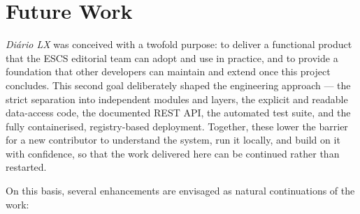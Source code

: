 \section{Future Work} \label{sec:conc_future}

\textit{Diário LX} was conceived with a twofold purpose: to deliver a functional product
that the ESCS editorial team can adopt and use in practice, and to provide a foundation
that other developers can maintain and extend once this project concludes. This second
goal deliberately shaped the engineering approach --- the strict separation into
independent modules and layers, the explicit and readable data-access code, the
documented REST API, the automated test suite, and the fully containerised,
registry-based deployment. Together, these lower the barrier for a new contributor to
understand the system, run it locally, and build on it with confidence, so that the work
delivered here can be continued rather than restarted.

On this basis, several enhancements are envisaged as natural continuations of the work:

